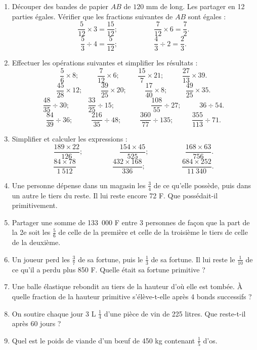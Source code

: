 \documentclass[12 pt]{extarticle}
\theoremstyle{plain}
\begin{document}
 \begin{enumerate}
 \item Découper des bandes de papier $AB$ de $120$ mm de long. Les partager en 12 parties égales. Vérifier 
 que les fractions suivantes de $AB$ sont égales : 
 \[ \frac5{12}\times 3 = \frac{15}{12}; \phantom{meow}\phantom{meow}\frac7{12}\times 6 = \frac72. \]
 \[ \frac53\div4=\frac5{12}; \phantom{meow}\phantom{meow}\frac43\div2=\frac23.\]
\item Effectuer les opérations suivantes et simplifier les résultats : 
\[ \frac56\times 8 ; \phantom{meow} \frac7{12}\times6; 
\phantom{meow}\frac{15}7\times21; \phantom{meow}
\frac{27}{13}\times 39.\] 
\[ \frac{45}{28} \times 12; \phantom{meow} \frac{39}{25} \times 20; \phantom{meow} 
\frac{17}{40}\times 8;\phantom{meow} \frac{49}{25}\times35 .\]
\[\frac{48}{35}\div30; \phantom{meow} \frac{33}{25}\div 15 ; \phantom{meow}\phantom{meow}
\frac{108}{55}\div 27 ; \phantom{meow} 
36 \div 54. \]
\[ \frac{84}{39}\div 36; \phantom{meow}
\frac{216}{35}\div 48 ; \phantom{meow}
\frac{360}{77}\div 135; \phantom{meow}
\frac{355}{113}\div 71.\]
\item Simplifier et calculer les expressions : 
\[ \frac{189\times 22}{126}; \phantom{meow}\phantom{meow} \frac{154\times 45}{525} ; \phantom{meow}\phantom{meow} \frac{168\times 63}{756}.\]
\[\frac{84\times 78}{1~512}\phantom{meow}\phantom{meow} \frac{432\times 168}{336} ; 
\phantom{meow}\phantom{meow} \frac{684\times 252}{11~340}.\]
\item Une personne dépense dans un magasin les $\frac34$ de ce qu'elle possède, puis dans un autre le tiers du reste. Il lui reste encore 72 F. Que possédait-il primitivement.
\item Partager une somme de 133~000 F entre 3 personnes de façon que la part de la 2e soit les $\frac56$ de celle de la première et celle de la troisième le tiers de celle de la deuxième. 
\item Un joueur perd les $\frac37$ de sa fortune, puis le $\frac13$ de sa fortune. Il lui reste le $\frac1{10}$ de ce qu'il a perdu plus 850 F. Quelle était sa fortune primitive ? 
\item Une balle élastique rebondit au tiers de la hauteur d'où elle est tombée. À quelle fraction de la hauteur primitive s'élève-t-elle après 4 bonds successifs ? 
\item On soutire chaque jour 3 L $\frac14$ d'une pièce de vin de 225 litres. Que reste-t-il après 60 jours ?
\item Quel est le poids de viande d'un bœuf de 450 kg contenant $\frac15$ d'os. 

\end{enumerate}
\end{document}
